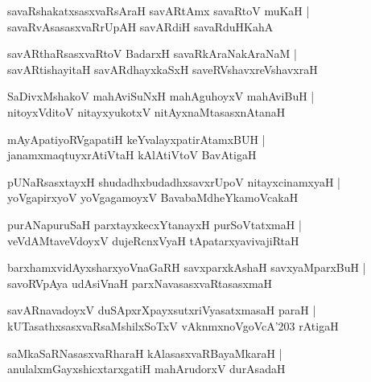 \documentclass[twoside,12pt,openright]{book}
\newcounter{shloka}[chapter]
\begin{document}
\begin{shloka}%
savaRshakatxsasxvaRsAraH savARtAmx savaRtoV muKaH |\\
savaRvAsasasxvaRrUpAH savARdiH savaRduHKahA
\end{shloka}

\begin{shloka}%
savARthaRsasxvaRtoV BadarxH savaRkAraNakAraNaM |\\
savARtishayitaH savARdhayxkaSxH saveRVshavxreVshavxraH 
\end{shloka}

\begin{shloka}%
SaDivxMshakoV mahAviSuNxH mahAguhoyxV mahAviBuH |\\
nitoyxVditoV nitayxyukotxV nitAyxnaMtasasxnAtanaH 
\end{shloka}

\begin{shloka}%
mAyApatiyoRVgapatiH keYvalayxpatirAtamxBUH |\\
janamxmaqtuyxrAtiVtaH kAlAtiVtoV BavAtigaH 
\end{shloka}

\begin{shloka}%
pUNaRsasxtayxH shudadhxbudadhxsavxrUpoV nitayxcinamxyaH |\\
yoVgapirxyoV yoVgagamoyxV BavabaMdheYkamoVcakaH 
\end{shloka}

\begin{shloka}%
purANapuruSaH parxtayxkecxYtanayxH purSoVtatxmaH |\\
veVdAMtaveVdoyxV dujeRcnxVyaH tApatarxyavivajiRtaH 
\end{shloka}

\begin{shloka}%
barxhamxvidAyxsharxyoVnaGaRH savxparxkAshaH savxyaMparxBuH |\\
savoRVpAya udAsiVnaH parxNavasasxvaRtasasxmaH 
\end{shloka}

\begin{shloka}%
savARnavadoyxV duSApxrXpayxsutxriVyasatxmasaH paraH |\\
kUTasathxsasxvaRsaMshilxSoTxV vAknmxnoVgoVcA\char'203 rAtigaH 
\end{shloka}

\begin{shloka}%
saMkaSaRNasasxvaRharaH kAlasasxvaRBayaMkaraH |\\
anulalxmGayxshicxtarxgatiH mahArudorxV durAsadaH 
\end{shloka}
\end{document}
